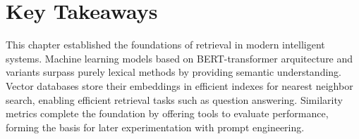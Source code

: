 \section{Key Takeaways}
This chapter established the foundations of retrieval in modern intelligent systems. Machine learning models based on BERT-transformer \cite{bertpretrainingdeepbidirectional} arquitecture and variants surpass purely lexical methods by providing semantic understanding. Vector databases store their embeddings in efficient indexes for nearest neighbor search, enabling efficient retrieval tasks such as question answering. Similarity metrics complete the foundation by offering tools to evaluate performance, forming the basis for later experimentation with prompt engineering.









